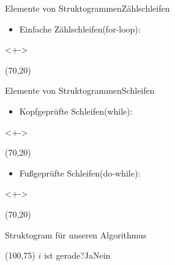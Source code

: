 \begin{frame}{Elemente von Struktogrammen}{Zählschleifen}
\begin{itemize}
    \item <+->Einfache Zählschleifen(for-loop):
\end{itemize}
\begin{onlyenv}<+->
\begin{centernss}
\begin{struktogramm}(70,20)
    \whileend
\end{struktogramm}
\end{centernss}
\end{onlyenv}
\end{frame}

\begin{frame}{Elemente von Struktogrammen}{Schleifen}
\begin{itemize}
    \item <+->Kopfgeprüfte Schleifen(while):
\end{itemize}
\begin{onlyenv}<+->
\begin{centernss}
\begin{struktogramm}(70,20)
    \whileend
\end{struktogramm}
\end{centernss}
\end{onlyenv}

\begin{itemize}
    \item <+->Fußgeprüfte Schleifen(do-while):
\end{itemize}
\begin{onlyenv}<+->
\begin{centernss}
\begin{struktogramm}(70,20)
    \untilend
\end{struktogramm}
\end{centernss}
\end{onlyenv}
\end{frame}

\begin{frame}{Struktogram für unseren Algorithmus}
\begin{centernss}
\begin{struktogramm}(100,75)
            {\( i \) ist gerade?}{Ja}{Nein}
            \change
        \ifend
    \whileend
\end{struktogramm}
\end{centernss}
\end{frame}

